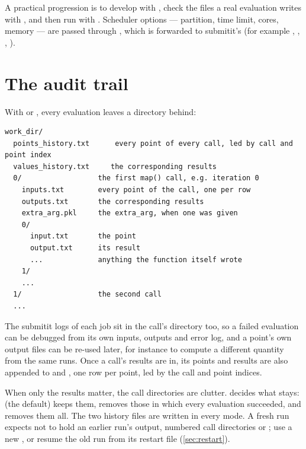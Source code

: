 A practical progression is to develop with , check the files a real evaluation
writes with , and then run with . Scheduler options --- partition, time
limit, cores, memory --- are passed through , which is forwarded to submitit's
 (for example , ,
, ).

\section{The audit trail}
\label{sec:audit}

With  or , every evaluation leaves a directory behind:

\begin{lstlisting}[style=plain]
work_dir/
  points_history.txt      every point of every call, led by call and point index
  values_history.txt     the corresponding results
  0/                  the first map() call, e.g. iteration 0
    inputs.txt        every point of the call, one per row
    outputs.txt       the corresponding results
    extra_arg.pkl     the extra_arg, when one was given
    0/
      input.txt       the point
      output.txt      its result
      ...             anything the function itself wrote
    1/
    ...
  1/                  the second call
  ...
\end{lstlisting}

The submitit logs of each job sit in the call's directory too, so a failed evaluation can be
debugged from its own inputs, outputs and error log, and a point's own output files can be re-used
later, for instance to compute a different quantity from the same runs. Once a call's results are
in, its points and results are also appended to  and
, one row per point, led by the call and point indices.

When only the results matter, the call directories are clutter.  decides what
stays:  (the default) keeps them,  removes those in which every
evaluation succeeded, and  removes them all. The two history files are written in
every mode. A fresh run expects  not to hold an earlier run's output, numbered call
directories or ; use a new , or resume the old run from its
restart file (\cref{sec:restart}).


